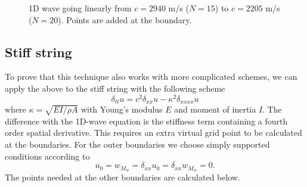 \documentclass[dvipsnames]{article}
\begin{document}
\begin{figure}[h]
    \centering
    \hspace{0.05\textwidth}
    \caption{1D wave going linearly from $c = 2940$ m/s ($N=15$) to $c =2205$ m/s ($N=20$). Points are added at the boundary.}\label{fig:addAtBoundary}
\end{figure}

\subsection{Stiff string}
To prove that this technique also works with more complicated schemes, we can apply the above to the stiff string with the following scheme
\begin{equation}
    \delta_{tt}u = c^2\delta_{xx}u - \kappa^2\delta_{xxxx}u
\end{equation}
where $\kappa = \sqrt{EI/\rho A}$ with Young's modulus $E$ and moment of inertia $I$. The difference with the 1D-wave equation is the stiffness term containing a fourth order spatial derivative. This requires an extra virtual grid point to be calculated at the boundaries. For the outer boundaries we choose simply supported conditions according to
\begin{equation}
    u_0 = w_{M_w} = \delta_{xx}u_0 =  \delta_{xx}w_{M_w} = 0.
\end{equation}
The points needed at the other boundaries are calculated below. 
\end{document}
